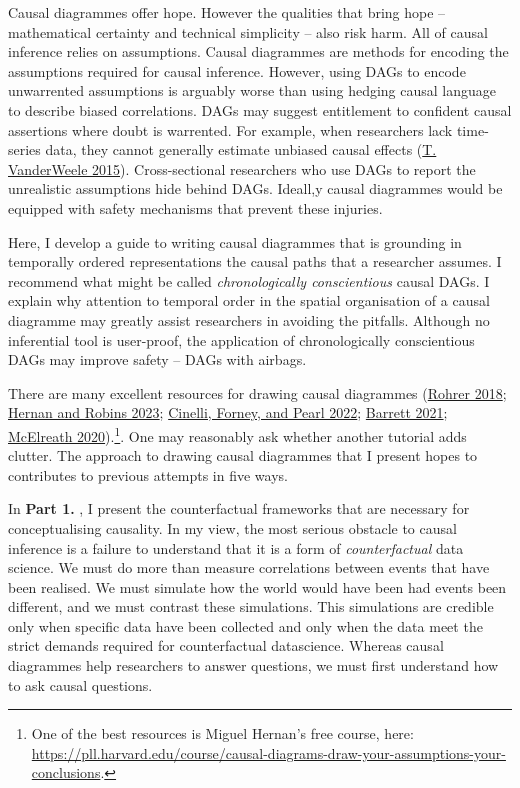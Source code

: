 \documentclass[
  singlecolumn]{report}
\begin{document}
Causal diagrammes offer hope. However the qualities that bring hope --
mathematical certainty and technical simplicity -- also risk harm. All
of causal inference relies on assumptions. Causal diagrammes are methods
for encoding the assumptions required for causal inference. However,
using DAGs to encode unwarrented assumptions is arguably worse than
using hedging causal language to describe biased correlations. DAGs may
suggest entitlement to confident causal assertions where doubt is
warrented. For example, when researchers lack time-series data, they
cannot generally estimate unbiased causal effects
(\protect\hyperlink{ref-vanderweele2015}{T. VanderWeele 2015}).
Cross-sectional researchers who use DAGs to report the unrealistic
assumptions hide behind DAGs. Ideall,y causal diagrammes would be
equipped with safety mechanisms that prevent these injuries.

Here, I develop a guide to writing causal diagrammes that is grounding
in temporally ordered representations the causal paths that a researcher
assumes. I recommend what might be called \emph{chronologically
conscientious} causal DAGs. I explain why attention to temporal order in
the spatial organisation of a causal diagramme may greatly assist
researchers in avoiding the pitfalls. Although no inferential tool is
user-proof, the application of chronologically conscientious DAGs may
improve safety -- DAGs with airbags.

There are many excellent resources for drawing causal diagrammes
(\protect\hyperlink{ref-rohrer2018}{Rohrer 2018};
\protect\hyperlink{ref-hernan2023}{Hernan and Robins 2023};
\protect\hyperlink{ref-cinelli2022}{Cinelli, Forney, and Pearl 2022};
\protect\hyperlink{ref-barrett2021}{Barrett 2021};
\protect\hyperlink{ref-mcelreath2020}{McElreath 2020}).\footnote{One of
  the best resources is Miguel Hernan's free course, here:
  \url{https://pll.harvard.edu/course/causal-diagrams-draw-your-assumptions-your-conclusions}.}.
One may reasonably ask whether another tutorial adds clutter. The
approach to drawing causal diagrammes that I present hopes to
contributes to previous attempts in five ways.

In \textbf{Part 1.} , I present the counterfactual frameworks that are
necessary for conceptualising causality. In my view, the most serious
obstacle to causal inference is a failure to understand that it is a
form of \emph{counterfactual} data science. We must do more than measure
correlations between events that have been realised. We must simulate
how the world would have been had events been different, and we must
contrast these simulations. This simulations are credible only when
specific data have been collected and only when the data meet the strict
demands required for counterfactual datascience. Whereas causal
diagrammes help researchers to answer questions, we must first
understand how to ask causal questions.
\end{document}
